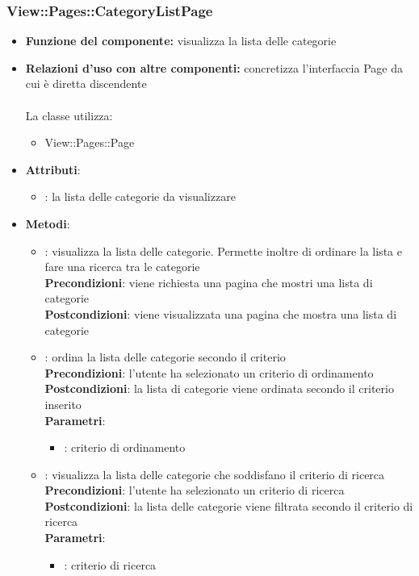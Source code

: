 \subsubsection{View::Pages::CategoryListPage}
\begin{itemize}
\item\textbf{Funzione del componente:} visualizza la lista delle categorie
				\item\textbf{Relazioni d'uso con altre componenti:} concretizza l'interfaccia Page da cui è diretta discendente\\ \\
La classe utilizza:
	\begin{itemize}
		\item View::Pages::Page\\
	\end{itemize}
\item\textbf{Attributi}:
	\begin{itemize}
		\item{}: la lista delle categorie da visualizzare\\
	\end{itemize}
\item\textbf{Metodi}:
	\begin{itemize}
		\item{}: visualizza la lista delle categorie. Permette inoltre di ordinare la lista e fare una ricerca tra le categorie\\
			\textbf{Precondizioni}: viene richiesta una pagina che mostri una lista di categorie\\
			\textbf{Postcondizioni}: viene visualizzata una pagina che mostra una lista di categorie\\
		\item{}: ordina la lista delle categorie secondo il criterio \\
			\textbf{Precondizioni}: l'utente ha selezionato un criterio di ordinamento\\
			\textbf{Postcondizioni}: la lista di categorie viene ordinata secondo il criterio inserito\\
			\textbf{Parametri}:
				\begin{itemize}
					\item{}: criterio di ordinamento\\
				\end{itemize}
		\item{}: visualizza la lista delle categorie che soddisfano il criterio di ricerca \\
			\textbf{Precondizioni}: l'utente ha selezionato un criterio di ricerca\\
			\textbf{Postcondizioni}: la lista delle categorie viene filtrata secondo il criterio di ricerca\\
			\textbf{Parametri}:
				\begin{itemize}
					\item{}: criterio di ricerca\\
				\end{itemize}
	\end{itemize}
\end{itemize}

